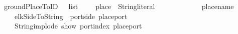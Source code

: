 \isamarkupfalse%
\ groundPlaceToID\ {\isacharcolon}{\isacharcolon}\ {\isachardoublequoteopen}\ list\ {\isasymRightarrow}\ {\isacharparenleft}\ \ \ place\ {\isasymRightarrow}\ String{\isachardot}literal{\isachardoublequoteclose}\isanewline
\ \ \ {\isachardoublequoteopen}\ \ {\isacharequal}\isanewline
\ \ \ \ \ {\isacharparenleft}\ {\isacharat}\ place{\isacharunderscore}name\ \ {\isacharplus}\isanewline
\ \ \ \ elkSideToString\ {\isacharparenleft}\ {\isacharparenleft}port{\isachardot}side\ {\isacharparenleft}place{\isacharunderscore}port\ \ {\isacharplus}\isanewline
\ \ \ \ String{\isachardot}implode\ {\isacharparenleft}show\ {\isacharparenleft}port{\isachardot}index\ {\isacharparenleft}place{\isacharunderscore}port\ 
